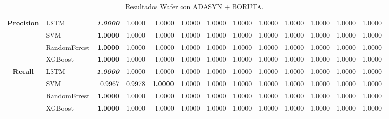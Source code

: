 \begin{table}[H]
\begin{adjustbox}{max width=12cm}
\begin{tabular}{|c|l|r|r|r|r|r|r|r|r|r|r|r|}
			\hline
			\textbf{Precision} &  LSTM & \textit{ \textbf{  1.0000 } } &  1.0000 &  1.0000 &  1.0000 &  1.0000 &  1.0000 &  1.0000 &  1.0000 &  1.0000 &  1.0000 &  1.0000 \\
			&  SVM & \textbf{  1.0000 } &  1.0000 &  1.0000 &  1.0000 &  1.0000 &  1.0000 &  1.0000 &  1.0000 &  1.0000 &  1.0000 &  1.0000 \\
			&  RandomForest & \textbf{  1.0000 } &  1.0000 &  1.0000 &  1.0000 &  1.0000 &  1.0000 &  1.0000 &  1.0000 &  1.0000 &  1.0000 &  1.0000 \\
			&  XGBoost & \textbf{  1.0000 } &  1.0000 &  1.0000 &  1.0000 &  1.0000 &  1.0000 &  1.0000 &  1.0000 &  1.0000 &  1.0000 &  1.0000 \\
			\hline
			\textbf{Recall} &  LSTM & \textit{ \textbf{  1.0000 } } &  1.0000 &  1.0000 &  1.0000 &  1.0000 &  1.0000 &  1.0000 &  1.0000 &  1.0000 &  1.0000 &  1.0000 \\
			&  SVM &  0.9967 &  0.9978 & \textbf{  1.0000 } &  1.0000 &  1.0000 &  1.0000 &  1.0000 &  1.0000 &  1.0000 &  1.0000 &  1.0000 \\
			&  RandomForest & \textbf{  1.0000 } &  1.0000 &  1.0000 &  1.0000 &  1.0000 &  1.0000 &  1.0000 &  1.0000 &  1.0000 &  1.0000 &  1.0000 \\
			&  XGBoost & \textbf{  1.0000 } &  1.0000 &  1.0000 &  1.0000 &  1.0000 &  1.0000 &  1.0000 &  1.0000 &  1.0000 &  1.0000 &  1.0000 \\
			\hline
		\end{tabular}
	\end{adjustbox}
	\caption{Resultados Wafer con ADASYN + BORUTA.}
	\label{tab:Wafer_ADASYN_BORUTA}
\end{table}

